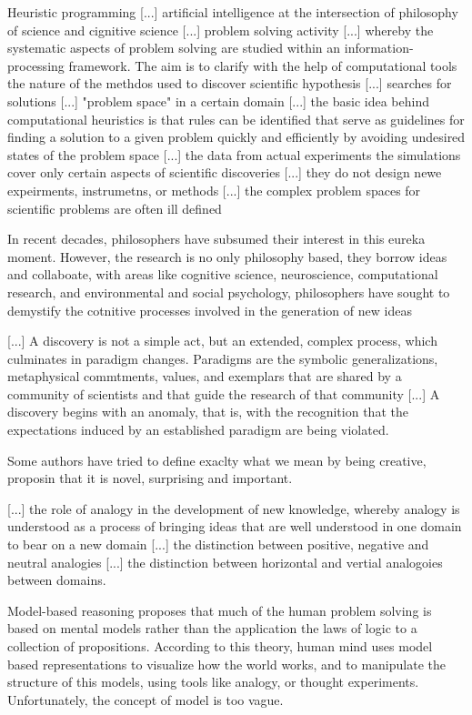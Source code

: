 {\color{red} Heuristic programming [...] artificial intelligence at the intersection of philosophy of science and cignitive science [...] problem solving activity [...] whereby the systematic aspects of problem solving are studied within an information-processing framework. The aim is to clarify with the help of computational tools the nature of the methdos used to discover scientific hypothesis [...] searches for solutions [...] "problem space" in a certain domain [...] the basic idea behind computational heuristics is that rules can be identified that serve as guidelines for finding a solution to a given problem quickly and efficiently by avoiding undesired states of the problem space [...] the data from actual experiments the simulations cover only certain aspects of scientific discoveries [...] they do not design newe expeirments, instrumetns, or methods [...] the complex problem spaces for scientific problems are often ill defined}

{\color{red} In recent decades, philosophers have subsumed their interest in this eureka moment. However, the research is no only philosophy based, they borrow ideas and collaboate, with areas like cognitive science, neuroscience, computational research, and environmental and social psychology, philosophers have sought to demystify the cotnitive processes involved in the generation of new ideas}

{\color{red} [...] A discovery is not a simple act, but an extended, complex process, which culminates in paradigm changes. Paradigms are the symbolic generalizations, metaphysical commtments, values, and exemplars that are shared by a community of scientists and that guide the research of that community [...] A discovery begins with an anomaly, that is, with the recognition that the expectations induced by an established paradigm are being violated.}

Some authors have tried to define exaclty what we mean by being creative, proposin that it is novel, surprising and important.

{\color{red} [...] the role of analogy in the development of new knowledge, whereby analogy is understood as a process of bringing ideas that are well understood in one domain to bear on a new domain [...] the distinction between positive, negative and neutral analogies [...] the distinction between horizontal and vertial analogoies between domains.}

Model-based reasoning proposes that much of the human problem solving is based on mental models rather than the application the laws of logic to a collection of propositions. According to this theory, human mind uses model based representations to visualize how the world works, and to manipulate the structure of this models, using tools like analogy, or thought experiments. Unfortunately, the concept of model is too vague.

